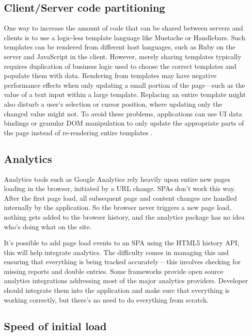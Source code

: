 \subsection{Client/Server code partitioning}
\label{subsec:arc_over_code}
One way to increase the amount of code that can be shared between servers and clients is to use a logic-less template language like Mustache or Handlebars. Such templates can be rendered from different host languages, such as Ruby on the server and JavaScript in the client. However, merely sharing templates typically requires duplication of business logic used to choose the correct templates and populate them with data. Rendering from templates may have negative performance effects when only updating a small portion of the page—such as the value of a text input within a large template. Replacing an entire template might also disturb a user's selection or cursor position, where updating only the changed value might not. To avoid these problems, applications can use UI data bindings or granular DOM manipulation to only update the appropriate parts of the page instead of re-rendering entire templates \cite{arc_over}.

\subsection{Analytics}
\label{subsec:arc_over_analytics}
Analytics tools such as Google Analytics rely heavily upon entire new pages loading in the browser, initiated by a URL change. SPAs don’t work this way.
After the first page load, all subsequent page and content changes are handled internally by the application. So the browser never triggers a new page load, nothing gets added to the browser history, and the analytics package has no idea who’s doing what on the site.

It's possible to add page load events to an SPA using the HTML5 history API; this will help integrate analytics. The difficulty comes in managing this and ensuring that everything is being tracked accurately – this involves checking for missing reports and double entries. Some frameworks provide open source analytics integrations addressing most of the major analytics providers. Developer should integrate them into the application and make sure that everything is working correctly, but there's no need to do everything from scratch.


\subsection{Speed of initial load}
\label{subsec:arc_over_speed}

